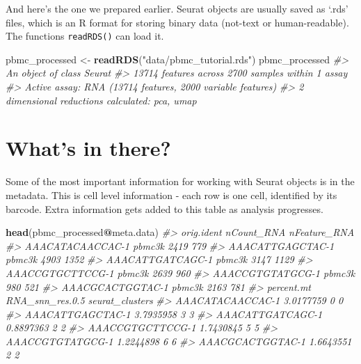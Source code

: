 \documentclass[
]{book}
\newenvironment{Shaded}{\begin{snugshade}}{\end{snugshade}}
\newcommand{\CommentTok}[1]{\textcolor[rgb]{0.56,0.35,0.01}{\textit{#1}}}
\newcommand{\FunctionTok}[1]{\textcolor[rgb]{0.13,0.29,0.53}{\textbf{#1}}}
\newcommand{\NormalTok}[1]{#1}
\newcommand{\OtherTok}[1]{\textcolor[rgb]{0.56,0.35,0.01}{#1}}
\newcommand{\SpecialCharTok}[1]{\textcolor[rgb]{0.81,0.36,0.00}{\textbf{#1}}}
\newcommand{\StringTok}[1]{\textcolor[rgb]{0.31,0.60,0.02}{#1}}
\begin{document}
And here's the one we prepared earlier. Seurat objects are usually saved as `.rds' files, which is an R format for storing binary data (not-text or human-readable). The functions \texttt{readRDS()} can load it.

\begin{Shaded}
\begin{Highlighting}[]
\NormalTok{pbmc\_processed }\OtherTok{\textless{}{-}} \FunctionTok{readRDS}\NormalTok{(}\StringTok{"data/pbmc\_tutorial.rds"}\NormalTok{)}
\NormalTok{pbmc\_processed}
\CommentTok{\#\textgreater{} An object of class Seurat }
\CommentTok{\#\textgreater{} 13714 features across 2700 samples within 1 assay }
\CommentTok{\#\textgreater{} Active assay: RNA (13714 features, 2000 variable features)}
\CommentTok{\#\textgreater{}  2 dimensional reductions calculated: pca, umap}
\end{Highlighting}
\end{Shaded}

\hypertarget{whats-in-there}{%
\section{What's in there?}\label{whats-in-there}}

Some of the most important information for working with Seurat objects is in the metadata.
This is cell level information - each row is one cell, identified by its barcode.
Extra information gets added to this table as analysis progresses.

\begin{Shaded}
\begin{Highlighting}[]
\FunctionTok{head}\NormalTok{(pbmc\_processed}\SpecialCharTok{@}\NormalTok{meta.data)}
\CommentTok{\#\textgreater{}                  orig.ident nCount\_RNA nFeature\_RNA}
\CommentTok{\#\textgreater{} AAACATACAACCAC{-}1     pbmc3k       2419          779}
\CommentTok{\#\textgreater{} AAACATTGAGCTAC{-}1     pbmc3k       4903         1352}
\CommentTok{\#\textgreater{} AAACATTGATCAGC{-}1     pbmc3k       3147         1129}
\CommentTok{\#\textgreater{} AAACCGTGCTTCCG{-}1     pbmc3k       2639          960}
\CommentTok{\#\textgreater{} AAACCGTGTATGCG{-}1     pbmc3k        980          521}
\CommentTok{\#\textgreater{} AAACGCACTGGTAC{-}1     pbmc3k       2163          781}
\CommentTok{\#\textgreater{}                  percent.mt RNA\_snn\_res.0.5 seurat\_clusters}
\CommentTok{\#\textgreater{} AAACATACAACCAC{-}1  3.0177759               0               0}
\CommentTok{\#\textgreater{} AAACATTGAGCTAC{-}1  3.7935958               3               3}
\CommentTok{\#\textgreater{} AAACATTGATCAGC{-}1  0.8897363               2               2}
\CommentTok{\#\textgreater{} AAACCGTGCTTCCG{-}1  1.7430845               5               5}
\CommentTok{\#\textgreater{} AAACCGTGTATGCG{-}1  1.2244898               6               6}
\CommentTok{\#\textgreater{} AAACGCACTGGTAC{-}1  1.6643551               2               2}
\end{Highlighting}
\end{Shaded}
\end{document}
